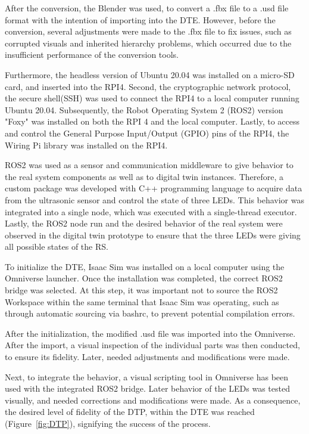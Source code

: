 \documentclass[conference]{IEEEtran}
\begin{document}
    After the conversion, the Blender was used, to convert a .fbx file to a .usd file format with the intention of importing into the DTE. However, before the conversion, 
    several adjustments were made to the .fbx file to fix issues, such as corrupted visuals and inherited hierarchy problems, which occurred due to the insufficient performance of the conversion tools. 

    Furthermore, the headless version of  Ubuntu 20.04 was installed on a micro-SD card, and inserted into the RPI4. Second, the cryptographic network protocol, the secure shell(SSH) 
    was used to connect the RPI4 to a local computer running Ubuntu 20.04. Subsequently, the Robot Operating System 2 (ROS2) version "Foxy" was installed on both the RPI 4 and the local computer. 
    Lastly, to access and control the General Purpose Input/Output (GPIO) pins of the RPI4, the Wiring Pi library was installed on the RPI4.

    ROS2 was used as a sensor and communication middleware to give behavior to the real system components as well as to digital twin instances. Therefore, a custom package was developed with
    C++ programming language to acquire data from the ultrasonic sensor and control the state of three LEDs. This behavior was integrated into a single node, which was executed with a single-thread executor. 
    Lastly, the ROS2 node run and the desired behavior of the real system were observed in the digital twin prototype to ensure that the three LEDs were giving all possible states of the RS.

    To initialize the DTE, Isaac Sim was installed on a local computer using the Omniverse launcher. Once the installation was completed, the correct ROS2 bridge was selected. 
    At this step, it was important not to source the ROS2 Workspace within the same terminal that Isaac Sim was operating, such as through automatic sourcing via bashrc, to prevent potential compilation errors. 

    After the initialization, the modified .usd file was imported into the Omniverse. 
    After the import, a visual inspection of the individual parts was then conducted, to ensure its fidelity. Later,  needed adjustments and modifications were made. 

    Next, to integrate the behavior, a visual scripting tool in Omniverse has been used with the integrated ROS2 bridge. Later behavior of the LEDs was tested visually, 
    and needed corrections and modifications were made. As a consequence, the desired level of fidelity of the DTP, within the DTE was reached (Figure~\ref{fig:DTP}), signifying the success of the process.
\end{document}
